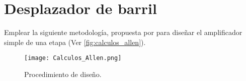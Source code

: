 \section{Desplazador de barril \label{sec:s1}}

\begin{center}
	\begin{minipage}{12cm}
		\begin{tcolorbox}[title=Actividad 1]
			Emplear la siguiente metodología, propuesta por \cite{Allen_2012} para diseñar el amplificador simple de una etapa (Ver \autoref{fig:calculos_allen}).
		\end{tcolorbox}	
	\end{minipage}
\end{center}

\begin{figure}[H]
	\centering
	\texttt{[image: Calculos\_Allen.png]}
	\caption{Procedimiento de diseño. \label{fig:calculos_allen}}
\end{figure}


